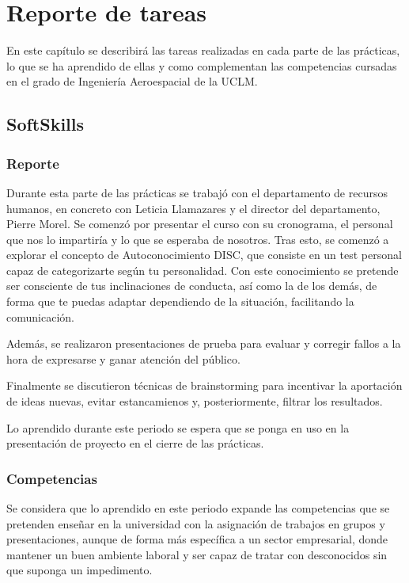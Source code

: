 \newcommand{\ReportSection}[4]{%
    \section{#1}  %
    \label{sec:#1}
    #2
    \subsection{Reporte}
    \label{subsec:report#1}
    #3
    \subsection{Competencias}
    \label{subsec:competences#1}
    #4
}




\chapter{Reporte de tareas}
\label{ch:taskReport}

En este capítulo se describirá las tareas realizadas en cada parte de las prácticas, lo que se ha aprendido de ellas y como complementan las competencias cursadas en el grado de Ingeniería Aeroespacial de la UCLM.


\ReportSection
{SoftSkills}{}
{
    Durante esta parte de las prácticas se trabajó con el departamento de recursos humanos, en concreto con Leticia Llamazares y el director del departamento, Pierre Morel.
    Se comenzó por presentar el curso con su cronograma, el personal que nos lo impartiría y lo que se esperaba de nosotros.
    Tras esto, se comenzó a explorar el concepto de Autoconocimiento DISC, que consiste en un test personal capaz de categorizarte según tu personalidad. Con este conocimiento se pretende ser consciente de tus inclinaciones de conducta, así como la de los demás, de forma que te puedas adaptar dependiendo de la situación, facilitando la comunicación.
    
    Además, se realizaron presentaciones de prueba para evaluar y corregir fallos a la hora de expresarse y ganar atención del público.
    
    Finalmente se discutieron técnicas de brainstorming para incentivar la aportación de ideas nuevas, evitar estancamienos y, posteriormente, filtrar los resultados.
    
    Lo aprendido durante este periodo se espera que se ponga en uso en la presentación de proyecto en el cierre de las prácticas.
    
}
{
    Se considera que lo aprendido en este periodo expande las competencias que se pretenden enseñar en la universidad con la asignación de trabajos en grupos y presentaciones, aunque de forma más específica a un sector empresarial, donde mantener un buen ambiente laboral y ser capaz de tratar con desconocidos sin que suponga un impedimento.
}

